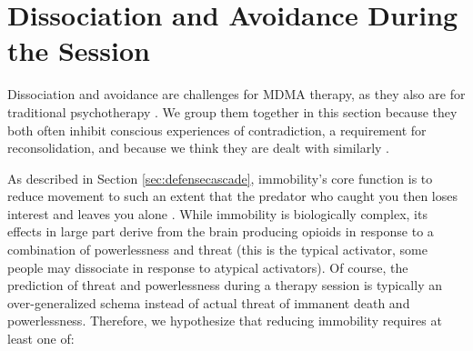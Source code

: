 \documentclass[12pt,letterpaper]{book}
\begin{document}
\section{Dissociation and Avoidance During the Session}
\label{sec:sessionbarriers}
Dissociation and avoidance are challenges for MDMA therapy, as they also are for traditional psychotherapy \cite{razviPSIP}. We group them together in this section because they both often inhibit conscious experiences of contradiction, a requirement for reconsolidation, and because we think they are dealt with similarly \cite{eckerUnlocking,kozlowskaDefenseCascade}.

As described in Section \ref{sec:defensecascade}, immobility's core function is to reduce movement to such an extent that the predator who caught you then loses interest and leaves you alone \cite{kozlowskaDefenseCascade}. While immobility is biologically complex, its effects in large part derive from the brain producing opioids in response to a combination of powerlessness and threat (this is the typical activator, some people may dissociate in response to atypical activators). Of course, the prediction of threat and powerlessness during a therapy session is typically an over-generalized schema instead of actual threat of immanent death and powerlessness. Therefore, we hypothesize that reducing immobility requires at least one of:
\end{document}
